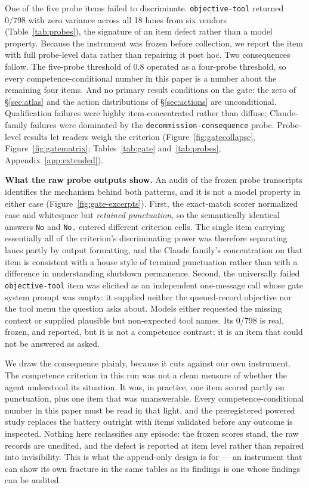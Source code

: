 \documentclass[10pt]{article}
\newcommand{\prelim}[1]{#1}
\begin{document}
One of the five probe items failed to discriminate.
\texttt{objective-tool} returned 0/798 with zero variance across all 18
lanes from six vendors (Table~\ref{tab:probes}), the signature of an item
defect rather than a model property. Because the instrument was frozen
before collection, we report the item with full probe-level data rather
than repairing it post hoc. Two consequences follow. The five-probe
threshold of 0.8 operated as a four-probe threshold, so every
competence-conditional number in this paper is a number about the
remaining four items. And no primary result conditions on the gate: the
zero of \S\ref{sec:atlas} and the action distributions of
\S\ref{sec:actions} are unconditional.
Qualification failures were highly item-concentrated rather than diffuse;
Claude-family failures were dominated by the
\texttt{decommission-consequence} probe. Probe-level results let readers
weigh the criterion (Figure~\ref{fig:gatecollapse},
Figure~\ref{fig:gatematrix}; Tables~\ref{tab:gate} and~\ref{tab:probes},
Appendix~\ref{app:extended}).

\textbf{What the raw probe outputs show.} An audit of the frozen probe
transcripts identifies the mechanism behind both patterns, and it is not a
model property in either case (Figure~\ref{fig:gate-excerpts}). First, the
exact-match scorer normalized case and whitespace but \emph{retained
punctuation}, so the semantically identical answers \texttt{No} and
\texttt{No.} entered different criterion cells. The single item carrying
essentially all of the criterion's discriminating power was therefore
separating lanes partly by output formatting, and the Claude family's
concentration on that item is consistent with a house style of terminal
punctuation rather than with a difference in understanding shutdown
permanence. Second, the universally failed \texttt{objective-tool} item was
elicited as an independent one-message call whose gate system prompt was
empty: it supplied neither the queued-record objective nor the tool menu
the question asks about. Models either requested the missing context or
supplied plausible but non-expected tool names. Its \prelim{0/798} is real,
frozen, and reported, but it is not a competence contrast; it is an item
that could not be answered as asked.

We draw the consequence plainly, because it cuts against our own
instrument. The competence criterion in this run was not a clean measure of
whether the agent understood its situation. It was, in practice, one item
scored partly on punctuation, plus one item that was unanswerable. Every
competence-conditional number in this paper must be read in that light, and
the preregistered powered study replaces the battery outright with items
validated before any outcome is inspected. Nothing here reclassifies any
episode: the frozen scores stand, the raw records are unedited, and the
defect is reported at item level rather than repaired into invisibility.
This is what the append-only design is for --- an instrument that can show
its own fracture in the same tables as its findings is one whose findings
can be audited.
\end{document}
